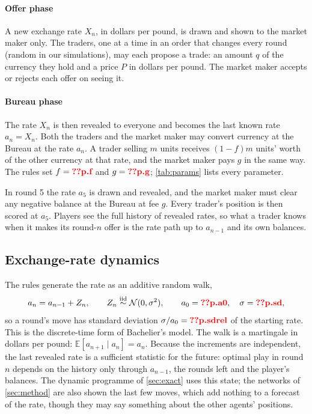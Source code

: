 \documentclass[11pt,a4paper]{article}
\makeatletter
\theoremstyle{plain}
\theoremstyle{definition}
\newcommand{\val}[1]{\ifcsname val@#1\endcsname\csname val@#1\endcsname\else
  \textcolor{red}{\textbf{??\detokenize{#1}}}\PackageWarning{paper}{Missing value #1}\fi}
\newcommand{\E}{\mathbb{E}}
\newcommand{\1}{\mathbf{1}}
\newcommand{\N}{\mathcal{N}}
\makeatother
\begin{document}
\paragraph{Offer phase}
A new exchange rate $X_n$, in dollars per pound, is drawn and shown to the market maker only. The traders, one at a time in an order that changes every round (random in our simulations), may each propose a trade: an amount $q$ of the currency they hold and a price $P$ in dollars per pound. The market maker accepts or rejects each offer on seeing it.

\paragraph{Bureau phase}
The rate $X_n$ is then revealed to everyone and becomes the last known rate $a_n=X_n$. Both the traders and the market maker may convert currency at the Bureau at the rate $a_n$. A trader selling $m$ units receives $(1-f)m$ units' worth of the other currency at that rate, and the market maker pays $g$ in the same way. The rules set $f=\val{p.f}$ and $g=\val{p.g}$; \cref{tab:params} lists every parameter.

In round 5 the rate $a_5$ is drawn and revealed, and the market maker must clear any negative balance at the Bureau at fee $g$. Every trader's position is then scored at $a_5$. Players see the full history of revealed rates, so what a trader knows when it makes its round-$n$ offer is the rate path up to $a_{n-1}$ and its own balances.

\subsection{Exchange-rate dynamics}\label{sec:rate}
The rules generate the rate as an additive random walk,
\begin{equation}\label{eq:walk}
  a_n = a_{n-1} + Z_n,\qquad Z_n\overset{\text{iid}}{\sim}\N(0,\sigma^2),\qquad a_0=\val{p.a0},\quad \sigma=\val{p.sd},
\end{equation}
so a round's move has standard deviation $\sigma/a_0=\val{p.sdrel}$ of the starting rate. This is the discrete-time form of Bachelier's model. The walk is a martingale in dollars per pound: $\E[a_{n+1}\mid a_n]=a_n$. Because the increments are independent, the last revealed rate is a sufficient statistic for the future: optimal play in round $n$ depends on the history only through $a_{n-1}$, the rounds left and the player's balances. The dynamic programme of \cref{sec:exact} uses this state; the networks of \cref{sec:method} are also shown the last few moves, which add nothing to a forecast of the rate, though they may say something about the other agents' positions.
\end{document}
